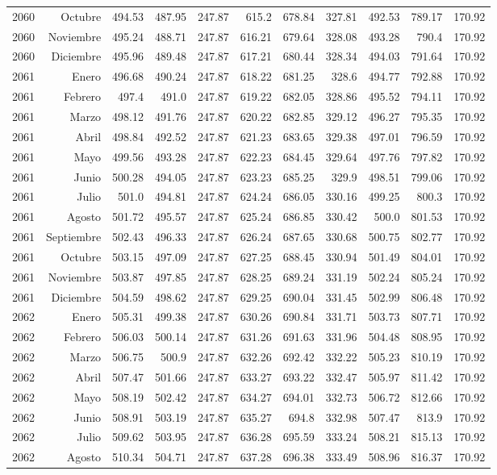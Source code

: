 \documentclass{article}%
\begin{document}
\begin{longtable}{|l r|r|r|r|r|r|r|r|r|r|}
2060&Octubre&494.53&487.95&247.87&615.2&678.84&327.81&492.53&789.17&170.92\\%
2060&Noviembre&495.24&488.71&247.87&616.21&679.64&328.08&493.28&790.4&170.92\\%
2060&Diciembre&495.96&489.48&247.87&617.21&680.44&328.34&494.03&791.64&170.92\\%
2061&Enero&496.68&490.24&247.87&618.22&681.25&328.6&494.77&792.88&170.92\\%
2061&Febrero&497.4&491.0&247.87&619.22&682.05&328.86&495.52&794.11&170.92\\%
2061&Marzo&498.12&491.76&247.87&620.22&682.85&329.12&496.27&795.35&170.92\\%
2061&Abril&498.84&492.52&247.87&621.23&683.65&329.38&497.01&796.59&170.92\\%
2061&Mayo&499.56&493.28&247.87&622.23&684.45&329.64&497.76&797.82&170.92\\%
2061&Junio&500.28&494.05&247.87&623.23&685.25&329.9&498.51&799.06&170.92\\%
2061&Julio&501.0&494.81&247.87&624.24&686.05&330.16&499.25&800.3&170.92\\%
2061&Agosto&501.72&495.57&247.87&625.24&686.85&330.42&500.0&801.53&170.92\\%
2061&Septiembre&502.43&496.33&247.87&626.24&687.65&330.68&500.75&802.77&170.92\\%
2061&Octubre&503.15&497.09&247.87&627.25&688.45&330.94&501.49&804.01&170.92\\%
2061&Noviembre&503.87&497.85&247.87&628.25&689.24&331.19&502.24&805.24&170.92\\%
2061&Diciembre&504.59&498.62&247.87&629.25&690.04&331.45&502.99&806.48&170.92\\%
2062&Enero&505.31&499.38&247.87&630.26&690.84&331.71&503.73&807.71&170.92\\%
2062&Febrero&506.03&500.14&247.87&631.26&691.63&331.96&504.48&808.95&170.92\\%
2062&Marzo&506.75&500.9&247.87&632.26&692.42&332.22&505.23&810.19&170.92\\%
2062&Abril&507.47&501.66&247.87&633.27&693.22&332.47&505.97&811.42&170.92\\%
2062&Mayo&508.19&502.42&247.87&634.27&694.01&332.73&506.72&812.66&170.92\\%
2062&Junio&508.91&503.19&247.87&635.27&694.8&332.98&507.47&813.9&170.92\\%
2062&Julio&509.62&503.95&247.87&636.28&695.59&333.24&508.21&815.13&170.92\\%
2062&Agosto&510.34&504.71&247.87&637.28&696.38&333.49&508.96&816.37&170.92\\%

\end{longtable}
\end{document}
